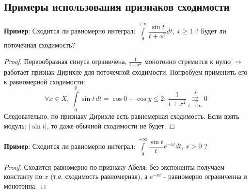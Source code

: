 \documentclass[12pt]{article}
\theoremstyle{definition}
\newcommand{\ddint}[2]{\displaystyle\int\limits_{#1}^{#2}}
\newcommand{\uconvm}[2]{\overset{#1}{\underset{#2}{\rightrightarrows}}}
\begin{document}
\subsection*{Примеры использования признаков сходимости}

\textbf{Пример}: Сходится ли равномерно интеграл: $\ddint{0}{+\infty}\dfrac{\sin{t}}{t+x^2}dt, \, x \geq 1$ ? Будет ли поточечная сходимость? 
\begin{proof}
	Первообразная синуса ограничена, $\tfrac{1}{t + x^2}$ монотонно стремится к нулю $\Rightarrow$ работает признак Дирихле для поточечной сходимости. Попробуем применить его к равномерной сходимости:
	$$
		\forall x \in X, \, \ddint{0}{y}\sin{t}\, dt = \cos{0} - \cos{y} \leq 2; \, \dfrac{1}{t + x^2} \uconvm{X}{t \to \infty} 0
	$$
	Следовательно, по признаку Дирихле есть равномерная сходимость. Если взять модуль: $|\sin{t}|$, то даже обычной сходимости не будет.
\end{proof}

\textbf{Пример}: Сходится ли равномерно интеграл: $\ddint{0}{+\infty}\dfrac{\sin{t}}{t}e^{-xt}dt, \, x > 0$ ?
\begin{proof}
	Сходится равномерно по признаку Абеля: без экспоненты получаем константу по $x$ (т.е. сходимость равномерная), а $e^{-xt}$ - равномерно ограниченна и монотонна.
\end{proof}
\end{document}
